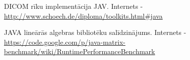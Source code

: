 \begin{thebibliography}{9}
DICOM rīku implementācija JAV. Internets - \url{http://www.schoech.de/diploma/toolkits.html#java}

JAVA lineārās algebras bibliotēku salīdzinājums. Internets - \url{https://code.google.com/p/java-matrix-benchmark/wiki/RuntimePerformanceBenchmark}
\end{thebibliography}